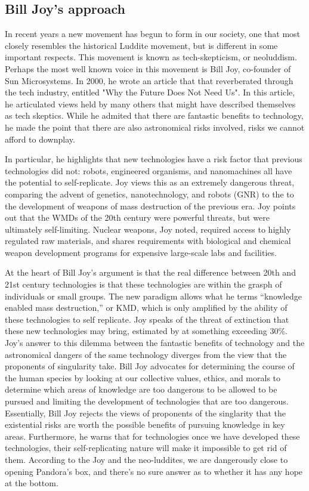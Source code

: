 \subsection{Bill Joy's approach}
  In recent years a new movement has begun to form in our society, one 
  that most closely resembles the historical Luddite movement, but is 
  different in some important respects. This movement is known as 
  tech-skepticism, or neoluddism. Perhaps the most well known voice in 
  this movement is Bill Joy, co-founder of Sun Microsystems. In 2000, 
  he wrote an article that that reverberated through the tech industry, 
  entitled "Why the Future Does Not Need Us"\cite{joy2000future}. In this 
  article, he articulated views held by many others that might have 
  described themselves as tech skeptics. While he admited that there are 
  fantastic benefits to technology, he made the point that there are 
  also astronomical risks involved, risks we cannot afford to downplay. 

  In particular, he highlights that new technologies have a risk factor 
  that previous technologies did not: robots, engineered organisms, and 
  nanomachines all have the potential to self-replicate.  Joy views this 
  as an extremely dangerous threat, comparing the advent of genetics, 
  nanotechnology, and robots (GNR) to the to the development of weapons 
  of mass destruction of the previous era. Joy points out that the 
  WMDs of the 20th century were powerful threats, but were ultimately 
  self-limiting.  Nuclear weapons, Joy noted, required access to highly 
  regulated raw materials, and shares requirements with biological and 
  chemical weapon development programs for expensive large-scale labs and 
  facilities.  

  At the heart of Bill Joy's argument is that the real difference between 
  20th and 21st century technologies is that these technologies are 
  within the grasph of individuals or small groups. The new paradigm 
  allows what he terms ``knowledge enabled mass destruction,'' or KMD, 
  which is only amplified by the ability of these technologies to self 
  replicate. Joy speaks of the threat of extinction that these new 
  technologies may bring, estimated by at something exceeding 
  30\%\cite{joy2000future}. Joy's answer to this dilemma between the 
  fantastic benefits of technology and the astronomical dangers of 
  the same technology diverges from the view that the proponents of 
  singularity take. Bill Joy advocates for determining the course of 
  the human species by looking at our collective values, ethics, and 
  morals to determine which areas of knowledge are too dangerous to be 
  allowed to be pursued and limiting the development of technologies 
  that are too dangerous. Essentially, Bill Joy rejects the views of 
  proponents of the singlarity that the existential risks are worth 
  the possible benefits of pursuing knowledge in key areas. Furthermore, 
  he warns that for technologies once we have developed these technologies, 
  their self-replicating nature will make it impossible to get rid of 
  them.  According to the Joy and the neo-luddites, we are dangerously close to 
  opening Pandora's box, and there's no sure answer as to whether it 
  has any hope at the bottom.


\label{sec:-bill}


